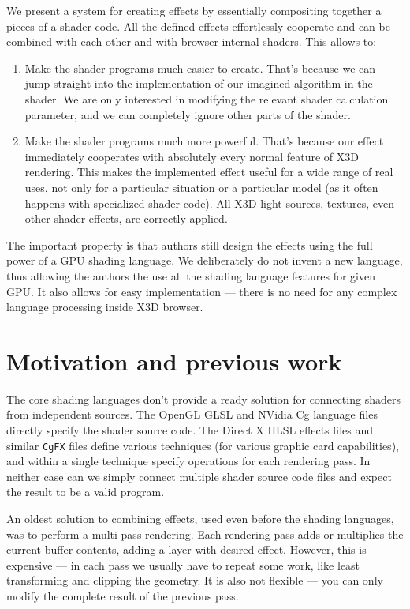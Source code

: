 \documentclass{acmsiggraph}                     %
\begin{document}
We present a system for creating effects by essentially compositing together
a pieces of a shader code. All the defined effects effortlessly
cooperate and can be combined with each other and with browser internal
shaders. This allows to:

\begin{enumerate}
\item Make the shader programs much easier to create. That's because we
  can jump straight into the implementation of our imagined algorithm
  in the shader.
  We are only interested in modifying the relevant shader calculation
  parameter, and we can completely ignore other parts of the shader.

\item Make the shader programs much more powerful. That's because our effect
  immediately cooperates with absolutely every normal feature of X3D rendering.
  This makes the implemented effect useful for a wide range of real uses,
  not only for a particular situation or a particular model (as it often happens
  with specialized shader code).
  All X3D light sources, textures, even other shader effects,
  are correctly applied.
\end{enumerate}

The important property is that authors still design the effects using
the full power of a GPU shading language.
We deliberately do not invent a new language, thus allowing
the authors the use all the shading language features for given GPU.
It also allows for easy implementation --- there is no need for any complex
language processing inside X3D browser.

\section{Motivation and previous work}

The core shading languages don't provide a ready solution for connecting shaders
from independent sources. The OpenGL GLSL \cite{glsl} and NVidia Cg \cite{cg}
language files directly specify the shader source code.
The Direct X HLSL \cite{hlsl} effects files and similar \texttt{CgFX}
files define various techniques (for various graphic card capabilities),
and within a single technique specify operations for each rendering pass.
In neither case can we simply connect multiple shader source code files
and expect the result to be a valid program.

An oldest solution to combining effects, used even before the shading languages,
was to perform a multi-pass rendering. Each rendering pass adds or multiplies
the current buffer contents, adding a layer with desired effect.
However, this is expensive --- in each pass we usually have to repeat
some work, like least transforming and clipping the geometry.
It is also not flexible --- you can only modify
the complete result of the previous pass.
\end{document}
